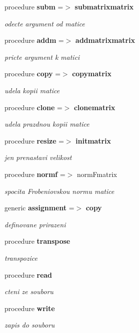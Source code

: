 \begin{DoxyCompactItemize}
procedure {\bf subm} =$>$ {\bf submatrixmatrix}
\begin{DoxyCompactList}\small\item\em odecte argument od matice \end{DoxyCompactList}\item 
procedure {\bf addm} =$>$ {\bf addmatrixmatrix}
\begin{DoxyCompactList}\small\item\em pricte argument k matici \end{DoxyCompactList}\item 
procedure {\bf copy} =$>$ {\bf copymatrix}
\begin{DoxyCompactList}\small\item\em udela kopii matice \end{DoxyCompactList}\item 
procedure {\bf clone} =$>$ {\bf clonematrix}
\begin{DoxyCompactList}\small\item\em udela prazdnou kopii matice \end{DoxyCompactList}\item 
procedure {\bf resize} =$>$ {\bf initmatrix}
\begin{DoxyCompactList}\small\item\em jen prenastavi velikost \end{DoxyCompactList}\item 
procedure {\bf normf} =$>$ norm\+Fmatrix
\begin{DoxyCompactList}\small\item\em spocita Frobeniovskou normu matice \end{DoxyCompactList}\item 
generic {\bf assignment} =$>$ {\bf copy}
\begin{DoxyCompactList}\small\item\em definovane prirazeni \end{DoxyCompactList}\item 
procedure {\bf transpose}
\begin{DoxyCompactList}\small\item\em transpozice \end{DoxyCompactList}\item 
procedure {\bf read}
\begin{DoxyCompactList}\small\item\em cteni ze souboru \end{DoxyCompactList}\item 
procedure {\bf write}
\begin{DoxyCompactList}\small\item\em zapis do souboru \end{DoxyCompactList}\end{DoxyCompactItemize}
